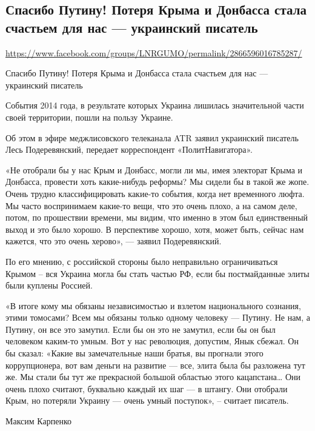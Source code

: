  
 
\subsection{Спасибо Путину! Потеря Крыма и Донбасса стала счастьем для нас --- украинский писатель}
\label{sec:24_07_2020.fb.lnr.6}
\url{https://www.facebook.com/groups/LNRGUMO/permalink/2866596016785287/}


Спасибо Путину! Потеря Крыма и Донбасса стала счастьем для нас --- украинский писатель

События 2014 года, в результате которых Украина лишилась значительной части
своей территории, пошли на пользу Украине.

Об этом в эфире меджлисовского телеканала ATR заявил украинский писатель Лесь
Подеревянский, передает корреспондент «ПолитНавигатора».

«Не отобрали бы у нас Крым и Донбасс, могли ли мы, имея электорат Крыма и
Донбасса, провести хоть какие-нибудь реформы? Мы сидели бы в такой же жопе.
Очень трудно классифицировать какие-то события, когда нет временного люфта. Мы
часто воспринимаем какие-то вещи, что это очень плохо, а на самом деле, потом,
по прошествии времени, мы видим, что именно в этом был единственный выход и это
было хорошо. В перспективе хорошо, хотя, может быть, сейчас нам кажется, что
это очень херово», --- заявил Подеревянский.

По его мнению, с российской стороны было неправильно ограничиваться Крымом –
вся Украина могла бы стать частью РФ, если бы постмайданные элиты были куплены
Россией.

«В итоге кому мы обязаны независимостью и взлетом национального сознания, этими
томосами? Всем мы обязаны только одному человеку --- Путину. Не нам, а Путину, он
все это замутил. Если бы он это не замутил, если бы он был человеком каким-то
умным. Вот у нас революция, допустим, Янык сбежал. Он бы сказал: «Какие вы
замечательные наши братья, вы прогнали этого коррупционера, вот вам деньги на
развитие --- все, элита была бы разложена тут же. Мы стали бы тут же прекрасной
большой областью этого кацапстана… Они очень плохо считают, буквально каждый их
шаг --- в штангу. Они отобрали Крым, но потеряли Украину --- очень умный поступок»,
– считает писатель.

Максим Карпенко
  
